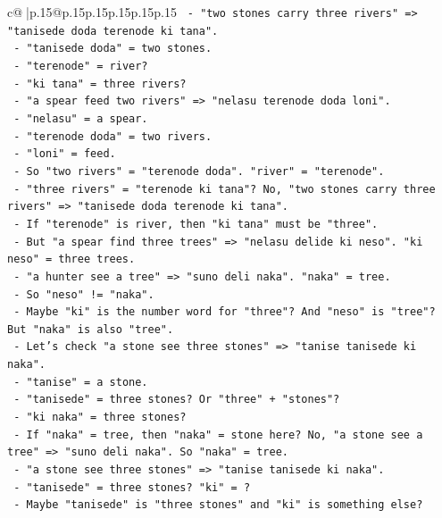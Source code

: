 \documentclass{article}
\begin{document}
{\begin{supertabular}{c@{$\;$}|p{.15\linewidth}@{}p{.15\linewidth}p{.15\linewidth}p{.15\linewidth}p{.15\linewidth}p{.15\linewidth}}
{{{\texttt{       {-} "two stones carry three rivers" => "tanisede doda terenode ki tana".} \\
\texttt{         {-} "tanisede doda" = two stones.} \\
\texttt{         {-} "terenode" = river?} \\
\texttt{         {-} "ki tana" = three rivers?} \\
\texttt{       {-} "a spear feed two rivers" => "nelasu terenode doda loni".} \\
\texttt{         {-} "nelasu" = a spear.} \\
\texttt{         {-} "terenode doda" = two rivers.} \\
\texttt{         {-} "loni" = feed.} \\
\texttt{       {-} So "two rivers" = "terenode doda". "river" = "terenode".} \\
\texttt{       {-} "three rivers" = "terenode ki tana"? No, "two stones carry three rivers" => "tanisede doda terenode ki tana".} \\
\texttt{         {-} If "terenode" is river, then "ki tana" must be "three".} \\
\texttt{         {-} But "a spear find three trees" => "nelasu delide ki neso". "ki neso" = three trees.} \\
\texttt{         {-} "a hunter see a tree" => "suno deli naka". "naka" = tree.} \\
\texttt{         {-} So "neso" != "naka".} \\
\texttt{         {-} Maybe "ki" is the number word for "three"? And "neso" is "tree"? But "naka" is also "tree".} \\
\texttt{         {-} Let's check "a stone see three stones" => "tanise tanisede ki naka".} \\
\texttt{           {-} "tanise" = a stone.} \\
\texttt{           {-} "tanisede" = three stones? Or "three" + "stones"?} \\
\texttt{           {-} "ki naka" = three stones?} \\
\texttt{           {-} If "naka" = tree, then "naka" = stone here? No, "a stone see a tree" => "suno deli naka". So "naka" = tree.} \\
\texttt{           {-} "a stone see three stones" => "tanise tanisede ki naka".} \\
\texttt{           {-} "tanisede" = three stones? "ki" = ?} \\
\texttt{           {-} Maybe "tanisede" is "three stones" and "ki" is something else?} \\
}}}
\end{supertabular}}
\end{document}

